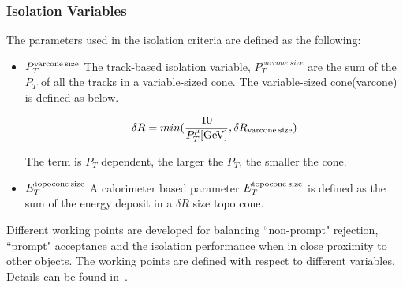 \subsubsection*{Isolation Variables}
The parameters used in the isolation criteria are defined as the following:
\begin{itemize}
    \item  $P_{T}^{\textrm{varcone\:size}}$ \newline
        The track-based isolation variable, $P_{T}^{varcone\:size}$ are the sum of the $P_{T}$ of all the tracks in a variable-sized cone. The variable-sized cone(varcone) is defined as below.

    
\begin{equation}
    \delta R = min(\frac{10}{P^{\mu}_{T}[\textrm{GeV}]}, \delta R_{\textrm{varcone\:size}}) 
 \end{equation}

The term is $P_{T}$ dependent, the larger the $P_{T}$, the smaller the cone. 
    \item $E^{\textrm{topocone\:size}}_{T}$ \newline
        A calorimeter based parameter $E^{\textrm{topocone\:size}}_T$ is defined as the sum of the energy deposit in a $\delta R$ size topo cone. 

\end{itemize}
Different working points are developed for balancing ``non-prompt" rejection, ``prompt" acceptance and the isolation performance when in close proximity to other objects. The working points are defined with respect to different variables. Details can be found in~\cite{muon2021}.

